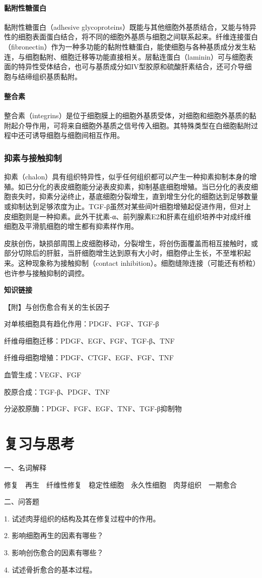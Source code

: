 \paragraph{黏附性糖蛋白}
黏附性糖蛋白（adhesive
glycoproteins）既能与其他细胞外基质结合，又能与特异性的细胞表面蛋白结合，将不同的细胞外基质与细胞之间联系起来。纤维连接蛋白（fibronectin）作为一种多功能的黏附性糖蛋白，能使细胞与各种基质成分发生粘连，与细胞黏附、细胞迁移等功能直接相关。层黏连蛋白（laminin）可与细胞表面的特异性受体结合，也可与基质成分如IV型胶原和硫酸肝素结合，还可介导细胞与结缔组织基质黏附。

\paragraph{整合素}
整合素（integrins）是位于细胞膜上的细胞外基质受体，对细胞和细胞外基质的黏附起介导作用，可将来自细胞外基质之信号传入细胞。其特殊类型在白细胞黏附过程中还可诱导细胞与细胞间相互作用。

\subsubsection{抑素与接触抑制}

抑素（chalon）具有组织特异性，似乎任何组织都可以产生一种抑素抑制本身的增殖。如已分化的表皮细胞能分泌表皮抑素，抑制基底细胞增殖。当已分化的表皮细胞丧失时，抑素分泌终止，基底细胞分裂增生，直到增生分化的细胞达到足够数量或抑制达到足够浓度为止。TGF-β虽然对某些间叶细胞增殖起促进作用，但对上皮细胞则是一种抑素。此外干扰素-α、前列腺素E2和肝素在组织培养中对成纤维细胞及平滑肌细胞的增生都有抑素样作用。

皮肤创伤，缺损部周围上皮细胞移动，分裂增生，将创伤面覆盖而相互接触时，或部分切除后的肝脏，当肝细胞增生达到原有大小时，细胞停止生长，不至堆积起来。这种现象称为接触抑制（contact
inhibition）。细胞缝隙连接（可能还有桥粒）也许参与接触抑制的调控。

\begin{center}
	\textbf{知识链接}
\end{center}

{【附】与创伤愈合有关的生长因子}

对单核细胞具有趋化作用：PDGF、FGF、TGF-β

纤维母细胞迁移：PDGF、EGF、FGF、TGF-β、TNF

纤维母细胞增殖：PDGF、CTGF、EGF、FGF、TNF

血管生成：VEGF、FGF

胶原合成：TGF-β、PDGF、TNF

分泌胶原酶：PDGF、FGF、EGF、TNF、TGF-β抑制物

\section*{复习与思考}

{一、名词解释}

修复　再生　纤维性修复　稳定性细胞　永久性细胞　肉芽组织　一期愈合

{二、问答题}

1. 试述肉芽组织的结构及其在修复过程中的作用。

2. 影响细胞再生的因素有哪些？

3. 影响创伤愈合的因素有哪些？

4. 试述骨折愈合的基本过程。
